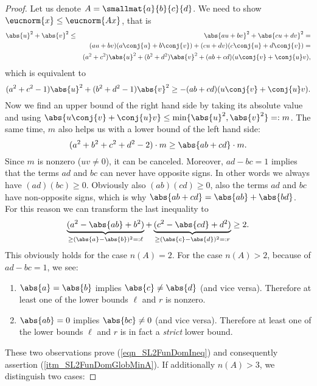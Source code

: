 \begin{proof}
Let us denote $A = \smallmat{a}{b}{c}{d}$. We need to show $\eucnorm{x} \le \eucnorm{Ax}$, that is
\begin{eqnarray*}
\abs{u}^2 + \abs{v}^2 
&\le& \abs{au + bv}^2 + \abs{cu + dv}^2 =\\
&& (au + bv)(a\conj{u} + b\conj{v}) + (cu + dv)(c\conj{u} + d\conj{v}) =\\
&& (a^2 + c^2)\abs{u}^2 + (b^2 + d^2)\abs{v}^2 + (ab + cd)(u\conj{v} + \conj{u}v),
\end{eqnarray*}
which is equivalent to
\begin{equation*}
(a^2 + c^2 - 1)\abs{u}^2 + (b^2 + d^2 - 1)\abs{v}^2 \ge -(ab + cd)(u\conj{v} + \conj{u}v).
\end{equation*}
Now we find an upper bound of the right hand side by taking its absolute value and using $\abs{u\conj{v} + \conj{u}v} \le \min\{\abs{u}^2, \abs{v}^2\} =: m$. The same time, $m$ also helps us with a lower bound of the left hand side:
\begin{equation*}
(a^2 + b^2 + c^2 + d^2 - 2) \cdot m \ge \abs{ab + cd} \cdot m.
\end{equation*}
Since $m$ is nonzero ($uv \ne 0$), it can be canceled. Moreover, $ad - bc = 1$ implies that the terms $ad$ and $bc$ can never have opposite signs. In other words we always have $(ad)(bc) \ge 0$. Obviously also $(ab)(cd) \ge 0$, \ie also the terms $ad$ and \label{err_bcInsteadOfcd} $bc$ have non-opposite signs, which is why $\abs{ab + cd} = \abs{ab} + \abs{bd}$. For this reason we can transform the last inequality to
\begin{equation}
\label{eqn_SL2FunDomIneq}
\underbrace{(a^2 - \abs{ab} + b^2)}_{\ge(\abs{a}-\abs{b})^2 =: \ell} + 
\underbrace{(c^2 - \abs{cd} + d^2)}_{\ge(\abs{c}-\abs{d})^2 =: r} \ge 2.
\end{equation}
This obviously holds for the case $n(A) = 2$. For the case $n(A) > 2$, because of $ad - bc = 1$, we see:
\begin{enumerate}[\quad(a)]
\item 
\label{itm_SL2FunDomObsA}
$\abs{a} = \abs{b}$ implies $\abs{c} \ne \abs{d}$ (and vice versa). Therefore at least one of the lower bounds $\ell$ and $r$ is nonzero.
\item 
\label{itm_SL2FunDomObsB}
$\abs{ab} = 0$ implies $\abs{bc} \ne 0$ (and vice versa). Therefore at least one of the lower bounds $\ell$ and $r$ is in fact a \emph{strict} lower bound.
\end{enumerate}
These two observations prove (\ref{eqn_SL2FunDomIneq}) and consequently assertion (\ref{itm_SL2FunDomGlobMinA}). If additionally $n(A) > 3$, we distinguish two cases:

\end{proof}
